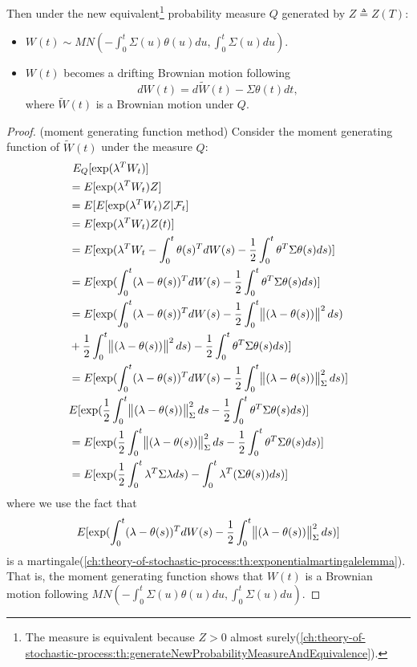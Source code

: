 \begin{refsection}
\begin{corollary}
	Then under the new equivalent\footnote{The measure is equivalent because $Z > 0$ almost surely(\autoref{ch:theory-of-stochastic-process:th:generateNewProbabilityMeasureAndEquivalence}).}  probability measure $Q$ generated by $Z\triangleq Z(T)$:
	\begin{itemize}
		\item $W(t)\sim MN(-\int_0^t \Sigma(u) \theta(u)du, \int_0^t \Sigma(u) du).$
		\item $W(t)$ becomes a drifting Brownian motion following 
		$$dW(t) = d\tilde{W}(t) - \Sigma \theta(t)dt,$$
		where $\tilde{W}(t)$ is a Brownian motion under $Q$. 
	\end{itemize}	
\end{corollary}
\begin{proof}
	(moment generating function method)
	Consider the moment generating function of $\tilde{W}(t)$ under the measure $Q$:
	\begin{align*}
	& ~E_Q[\exp(\lambda^TW_t)] \\
	& = E[\exp(\lambda^T W_t)Z] \\
	&=E[E[\exp(\lambda^TW_t)Z|\mathcal{F}_t] \\
	&=E[\exp(\lambda^TW_t)Z(t)] \\
	&=E[\exp(\lambda^TW_t  -\int_0^t \theta(s)^TdW(s) - \frac{1}{2}\int_0^t \theta^T\Sigma\theta(s)ds)]\\
	&=E[\exp(\int_0^t (\lambda-\theta(s))^TdW(s) - \frac{1}{2}\int_0^t \theta^T\Sigma\theta(s)ds)]\\
	&=E[\exp(\int_0^t (\lambda-\theta(s))^TdW(s)  - \frac{1}{2}\int_0^t \norm{(\lambda-\theta(s))}^2ds) \\
	&+ \frac{1}{2}\int_0^t \norm{(\lambda-\theta(s))}^2ds)- \frac{1}{2}\int_0^t \theta^T\Sigma
	\theta(s)ds)]\\
	&=E[\exp(\int_0^t (\lambda-\theta(s))^TdW(s) - \frac{1}{2}\int_0^t \norm{(\lambda-\theta(s))}^2_\Sigma ds)]\\
	&E[\exp(\frac{1}{2}\int_0^t \norm{(\lambda-\theta(s))}^2_\Sigma ds- \frac{1}{2}\int_0^t \theta^T\Sigma\theta(s)ds)] \\
	&=E[\exp( \frac{1}{2}\int_0^t \norm{(\lambda-\theta(s))}^2_\Sigma ds- \frac{1}{2}\int_0^t \theta^T\Sigma\theta(s)ds)] \\
	&=E[\exp(\frac{1}{2}\int_0^t \lambda^T\Sigma\lambda ds) - \int_0^t \lambda^T(\Sigma \theta(s)) ds)]
	\end{align*}
	where we use the fact that $$E[\exp(\int_0^t (\lambda-\theta(s))^TdW(s) - \frac{1}{2}\int_0^t \norm{(\lambda-\theta(s))}^2_\Sigma ds)]$$ is a martingale(\autoref{ch:theory-of-stochastic-process:th:exponentialmartingalelemma}). 
	That is, the moment generating function shows that $W(t)$ is a Brownian motion following $MN(-\int_0^t \Sigma(u) \theta(u)du, \int_0^t \Sigma(u) du)$.
\end{proof}



\end{refsection}
